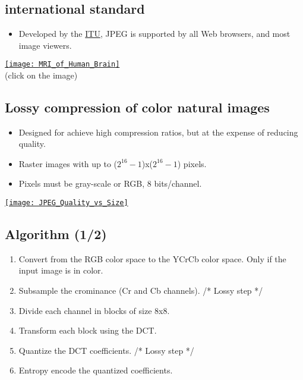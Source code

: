 \chapter{}

\section{ international standard}
\begin{itemize}
\item Developed by the
  \href{https://www.itu.int}{ITU}, \gls{JPEG}
  \cite{ccitt.t81} is
  supported by all Web browsers, and most image viewers.
\end{itemize}
\vspace{-2ex}
\begin{center}
  \href{https://en.wikipedia.org/wiki/Magnetic_resonance_imaging_of_the_brain#/media/File:MRI_of_Human_Brain.jpg}{\texttt{[image: MRI\_of\_Human\_Brain]}}\\
  (click on the image)
\end{center}

\section{Lossy compression of color natural images}
\begin{itemize}
\item Designed for achieve high compression ratios, but at the expense of reducing quality.
  \item Raster images with up to ($2^{16}-1$)x($2^{16}-1$) pixels.
\item Pixels must be gray-scale or \gls{RGB}, 8 bits/channel.
\end{itemize}
\vspace{-2ex}
\begin{center}
  \href{https://www.thewebmaster.com/jpeg-definitive-guide/}{\texttt{[image: JPEG\_Quality\_vs\_Size]}}
\end{center}

\section{Algorithm (1/2)}
\begin{enumerate}
\item Convert from the \gls{RGB} color space to the \gls{YCrCb} color
  space. Only if the input image is in color.
\item Subsample the crominance (Cr and Cb channels). /* Lossy step */
\item Divide each channel in blocks of size 8x8.
\item Transform each block using the \gls{DCT}.
\item Quantize the \gls{DCT} coefficients. /* Lossy step */
\item Entropy encode the quantized coefficients.
\end{enumerate}

